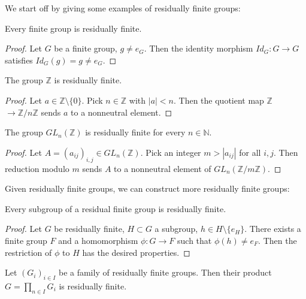We start off by giving some examples of residually finite groups:

\begin{lemma}
Every finite group is residually finite.
\end{lemma}

\begin{proof}
Let $G$ be a finite group, $g \neq e_G$. Then the identity morphism $Id_G: G \rightarrow G$ satisfies $Id_G(g) = g \neq e_G$.
\end{proof}

\begin{lemma}
The group $\mathbb{Z}$ is residually finite.
\end{lemma}

\begin{proof}
Let $a \in \mathbb{Z}\setminus\{0\}$. Pick $n \in \mathbb{Z}$ with $ | a | < n$. Then the quotient map $\mathbb{Z}$ $\rightarrow \mathbb{Z}/ n\mathbb{Z}$ sends $a$ to a nonneutral element.
\end{proof}

\begin{lemma}
The group $GL_n (\mathbb{Z} )$ is residually finite for every $n \in \mathbb{N}$.
\end{lemma}

\begin{proof}
Let $A = (a_{ij})_{i,j} \in GL_n( \mathbb{Z})$. Pick an integer $m > | a_{ij} |$ for all $i,j$. Then reduction modulo $m$ sends $A$ to a nonneutral element of $GL_n(\mathbb{Z}/m \mathbb{Z})$.
\end{proof}

Given residually finite groups, we can construct more residually finite groups:

\begin{lemma}
Every subgroup of a residual finite group is residually finite.
\end{lemma}

\begin{proof}
Let $G$ be residually finite, $H \subset G$ a subgroup, $h \in H \setminus \{ e_H \}$. There exists a finite group $F$ and a homomorphism $\phi : G \rightarrow F$ such that $\phi (h) \neq e_F$. Then the restriction of $\phi$ to $H$ has the desired properties.
\end{proof}

\begin{proposition}
Let $(G_i)_{ i \in I}$ be a family of residually finite groups. Then their product $G = \prod_{n \in I} G_i$ is residually finite.
\end{proposition}

